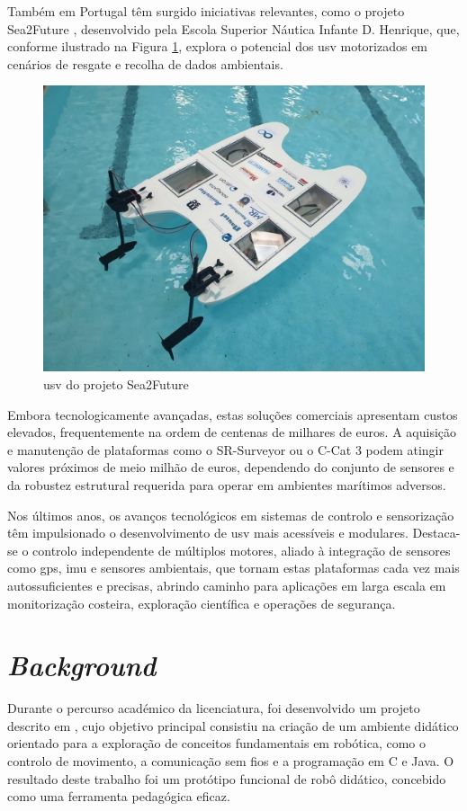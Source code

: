 Também em Portugal têm surgido iniciativas relevantes, como o projeto Sea2Future \cite{sea2future,sea2future2}, desenvolvido pela Escola Superior Náutica Infante D. Henrique, que, conforme ilustrado na Figura \ref{fig:sea2future}, explora o potencial dos \gls{usv} motorizados em cenários de resgate e recolha de dados ambientais.

\begin{figure}[H]
    \centering
    \includegraphics[width=0.5\linewidth]{figuras/sea2future.jpg}
    \caption[\gls{usv} do projeto Sea2Future]{\gls{usv} do projeto Sea2Future \cite{sea2future,sea2future2}}
    \label{fig:sea2future}
\end{figure}

Embora tecnologicamente avançadas, estas soluções comerciais apresentam custos elevados, frequentemente na ordem de centenas de milhares de euros. A aquisição e manutenção de plataformas como o SR-Surveyor ou o C-Cat 3 podem atingir valores próximos de meio milhão de euros, dependendo do conjunto de sensores e da robustez estrutural requerida para operar em ambientes marítimos adversos.  

Nos últimos anos, os avanços tecnológicos em sistemas de controlo e sensorização têm impulsionado o desenvolvimento de \gls{usv} mais acessíveis e modulares. Destaca-se o controlo independente de múltiplos motores, aliado à integração de sensores como \gls{gps}, \gls{imu} e sensores ambientais, que tornam estas plataformas cada vez mais autossuficientes e precisas, abrindo caminho para aplicações em larga escala em monitorização costeira, exploração científica e operações de segurança.

\section{\emph{Background}} 
\label{sec:background}

Durante o percurso académico da licenciatura, foi desenvolvido um projeto descrito em \cite{didactic-robot-thesis}, cujo objetivo principal consistiu na criação de um ambiente didático orientado para a exploração de conceitos fundamentais em robótica, como o controlo de movimento, a comunicação sem fios e a programação em C e Java. O resultado deste trabalho foi um protótipo funcional de robô didático, concebido como uma ferramenta pedagógica eficaz.  

